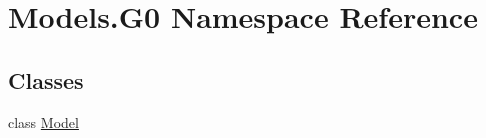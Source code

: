 \hypertarget{namespace_models_1_1_g0}{\section{Models.\-G0 Namespace Reference}
\label{namespace_models_1_1_g0}
}
\subsection*{Classes}
\begin{DoxyCompactItemize}
\item 
class \hyperlink{class_models_1_1_g0_1_1_model}{Model}
\end{DoxyCompactItemize}
